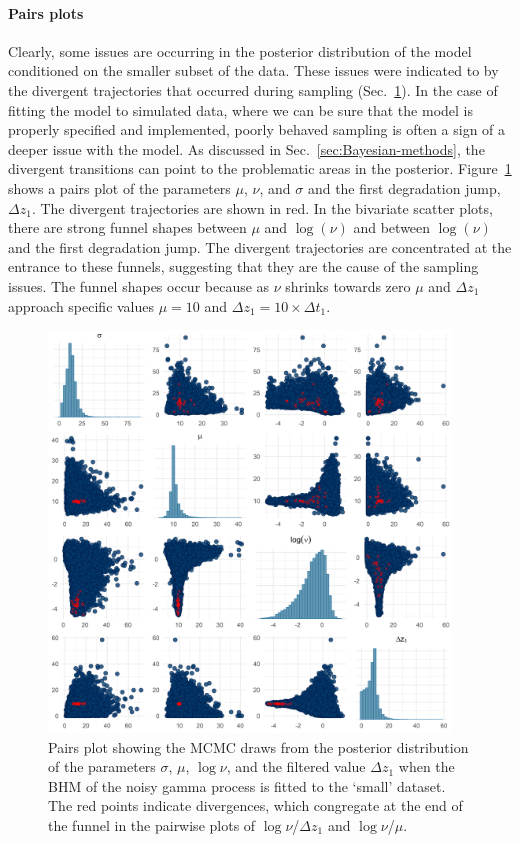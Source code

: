 \paragraph*{Pairs plots}
Clearly, some issues are occurring in the posterior distribution of the model conditioned on the smaller subset of the data. These issues were indicated to by the divergent trajectories that occurred during sampling (Sec.~\ref{fig:pairs}). In the case of fitting the model to simulated data, where we can be sure that the model is properly specified and implemented, poorly behaved sampling is often a sign of a deeper issue with the model. As discussed in Sec.~\ref{sec:Bayesian-methods}, the divergent transitions can point to the problematic areas in the posterior. Figure~\ref{fig:pairs} shows a pairs plot of the parameters $\mu$, $\nu$, and $\sigma$ and the first degradation jump, $\Delta z_1$. The divergent trajectories are shown in red. In the bivariate scatter plots, there are strong funnel shapes between $\mu$ and $\log(\nu)$ and between $\log(\nu)$ and the first degradation jump. The divergent trajectories are concentrated at the entrance to these funnels, suggesting that they are the cause of the sampling issues. The funnel shapes occur because as $\nu$ shrinks towards zero $\mu$ and $\Delta z_1$ approach specific values $\mu = 10$ and $\Delta z_1 = 10 \times \Delta t_1$.

\begin{figure}
  \centering
  \includegraphics[width=0.95\textwidth]{./figures/ch-4/Small-data-pairs.png}
  \caption{Pairs plot showing the MCMC draws from the posterior distribution of the parameters $\sigma$, $\mu$, $\log\nu$, and the filtered value $\Delta z_1$ when the BHM of the noisy gamma process is fitted to the `small' dataset. The red points indicate divergences, which congregate at the end of the funnel in the pairwise plots of $\log\nu$/$\Delta z_1$ and $\log\nu$/$\mu$.}
  \label{fig:pairs}
\end{figure}

